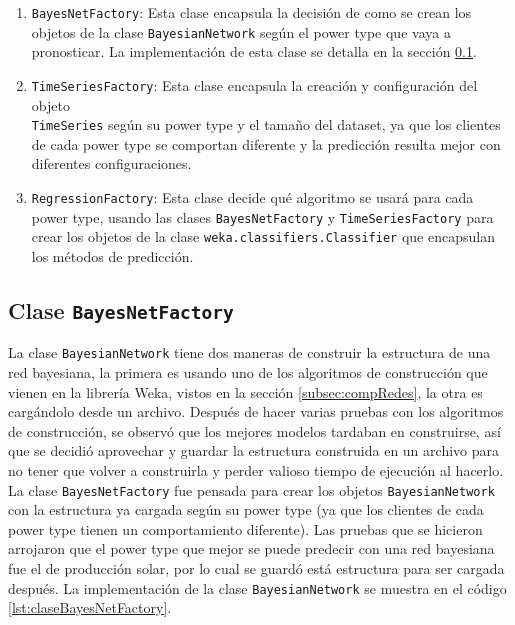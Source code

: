 \begin{enumerate}
	\item \texttt{BayesNetFactory}: Esta clase encapsula la decisión de como se crean los objetos de la clase \texttt{BayesianNetwork} según el power type que vaya a pronosticar. La implementación de esta clase se detalla en la sección \ref{subsec:claseBayesNetFactory}.
	
	\item \texttt{TimeSeriesFactory}: Esta clase encapsula la creación y configuración del objeto \\\texttt{TimeSeries} según su power type y el tamaño del dataset, ya que los clientes de cada power type se comportan diferente y la predicción resulta mejor con diferentes configuraciones.
	
	\item \texttt{RegressionFactory}: Esta clase decide qué algoritmo se usará para cada power type, usando las clases \texttt{BayesNetFactory} y \texttt{TimeSeriesFactory} para crear los objetos de la clase \texttt{weka.classifiers.Classifier} que encapsulan los métodos de predicción.
\end{enumerate} %

\subsection{Clase \texttt{BayesNetFactory}} \label{subsec:claseBayesNetFactory}
La clase \texttt{BayesianNetwork} tiene dos maneras de construir la estructura de una red bayesiana, la primera es usando uno de los algoritmos de construcción que vienen en la librería Weka, vistos en la sección \ref{subsec:compRedes}, la otra es cargándolo desde un archivo. Después de hacer varias pruebas con los algoritmos de construcción, se observó que los mejores modelos tardaban en construirse, así que se decidió aprovechar y guardar la estructura construida en un archivo para no tener que volver a construirla y perder valioso tiempo de ejecución al hacerlo. La clase \texttt{BayesNetFactory} fue pensada para crear los objetos \texttt{BayesianNetwork} con la estructura ya cargada según su power type (ya que los clientes de cada power type tienen un comportamiento diferente). Las pruebas que se hicieron arrojaron que el power type que mejor se puede predecir con una red bayesiana fue el de producción solar, por lo cual se guardó está estructura para ser cargada después.
La implementación de la clase \texttt{BayesianNetwork} se muestra en el código \ref{lst:claseBayesNetFactory}.

